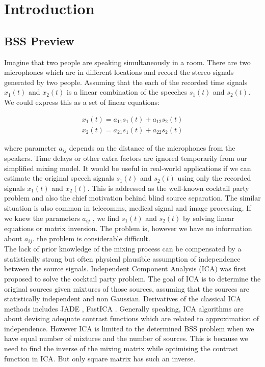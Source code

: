 \section{Introduction} \label{intro}
\subsection{BSS Preview}
Imagine that two people are speaking simultaneously in a room. There are two microphones which are in different locations and record the stereo signals generated by two people. Assuming that the each of the recorded time signals $x_1(t)$ and $x_2(t)$ is a linear combination of the speeches $s_1(t)$ and $s_2(t)$. We could express this as a set of linear equations:

\begin{align}
    x_1(t) = a_{11}s_1(t) + a_{12}s_2(t)\\
    x_2(t) = a_{21}s_1(t) + a_{22}s_2(t)
\end{align}

where parameter $a_{ij}$ depends on the distance of the microphones from the speakers. Time delays or other extra factors are ignored temporarily from our simplified mixing model. It would be useful in real-world applications if we can estimate the original speech signals $s_1(t)$ and $s_2(t)$ using only the recorded signals $x_1(t)$ and $x_2(t)$. This is addressed as the well-known cocktail party problem and also the chief motivation behind blind source separation. The similar situation is also common in telecomms, medical signal and image processing. If we knew the parameters $a_{ij}$ , we find $s_1(t)$ and $s_2(t)$  by solving linear equations or matrix inversion. The problem is, however we have no information about $a_{ij}$. the problem is considerable difficult.\\

The lack of prior knowledge of the mixing process can be compensated by a statistically strong but often physical plausible assumption of independence between the source signals. Independent Component Analysis (ICA) was first proposed to solve the cocktail party problem. The goal of ICA is to determine the original sources given mixtures of those sources, assuming that the sources are statistically independent and non Gaussian. Derivatives of the classical ICA methods includes JADE \cite{JADE720250}, FastICA \cite{fastICA777510}. Generally speaking, ICA algorithms are about devising adequate contrast functions which are related to approximation of independence\cite{HYVARINEN2000411}. However ICA is limited to the determined BSS problem when we have equal number of mixtures and the number of sources. This is because we need to find the inverse of the mixing matrix while optimising the contrast function in ICA. But only square matrix has such an inverse. 


